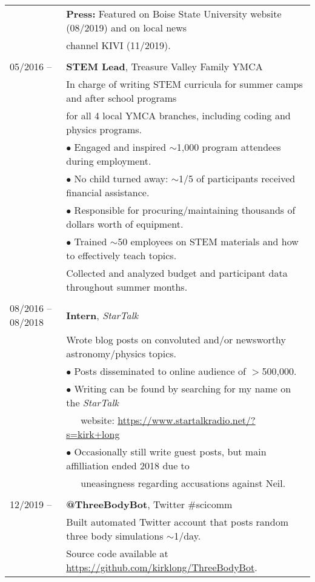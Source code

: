 \documentclass[11pt]{article}
\begin{document}
\begin{tabular}{ll}
      & \textbf{Press:} Featured on Boise State University website (08/2019) and on local news \\
      & channel KIVI (11/2019). \\
      & \\
05/2016 --    &   \textbf{STEM Lead}, Treasure Valley Family YMCA \vspace{1mm} \\
      & In charge of writing STEM curricula for summer camps and after school programs \\
      & for all 4 local YMCA branches, including coding and physics programs. \vspace{0.5mm}\\
      & $\bullet$ Engaged and inspired $\sim$1,000 program attendees during employment. \\
      & $\bullet$ No child turned away: $\sim$1/5 of participants received financial assistance. \\
      & $\bullet$ Responsible for procuring/maintaining thousands of dollars worth of equipment. \\
      & $\bullet$ Trained $\sim$50 employees on STEM materials and how to effectively teach topics. \vspace{1mm} \\
      & Collected and analyzed budget and participant data throughout summer months. \\
      & \\
08/2016 -- 08/2018    &   \textbf{Intern}, \textit{StarTalk} \vspace{1mm} \\
      & Wrote blog posts on convoluted and/or newsworthy astronomy/physics topics. \\
      & $\bullet$ Posts disseminated to online audience of $>$500,000. \\
      & $\bullet$ Writing can be found by searching for my name on the \textit{StarTalk} \\
      & \-\ \-\ \-\ website: \url{https://www.startalkradio.net/?s=kirk+long} \\
      & $\bullet$ Occasionally still write guest posts, but main affilliation ended 2018 due to \\
      & \-\ \-\ \-\ uneasingness regarding accusations against Neil. \vspace{1mm} \\
      & \\
12/2019 --    &   \textbf{@ThreeBodyBot}, Twitter \#scicomm \vspace{1mm} \\
      & Built automated Twitter account that posts random three body simulations $\sim$1/day. \\
      & Source code available at \url{https://github.com/kirklong/ThreeBodyBot}. \\
\end{tabular}
\end{document}
